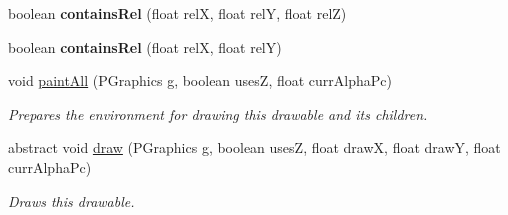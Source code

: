 \begin{DoxyCompactItemize}
\item 
\hypertarget{classhype_1_1core_1_1drawable_1_1_h_drawable_a8ae24b40927238f1be71ad4ff3120874}{boolean {\bfseries contains\-Rel} (float rel\-X, float rel\-Y, float rel\-Z)}\label{classhype_1_1core_1_1drawable_1_1_h_drawable_a8ae24b40927238f1be71ad4ff3120874}

\item 
\hypertarget{classhype_1_1core_1_1drawable_1_1_h_drawable_acd096b75e5eb22539a74db0528bf14a7}{boolean {\bfseries contains\-Rel} (float rel\-X, float rel\-Y)}\label{classhype_1_1core_1_1drawable_1_1_h_drawable_acd096b75e5eb22539a74db0528bf14a7}

\item 
void \hyperlink{classhype_1_1core_1_1drawable_1_1_h_drawable_a700c4d4a347c13048ccfb92ea4f6f50b}{paint\-All} (P\-Graphics g, boolean uses\-Z, float curr\-Alpha\-Pc)
\begin{DoxyCompactList}\small\item\em Prepares the environment for drawing this drawable and its children. \end{DoxyCompactList}\item 
abstract void \hyperlink{classhype_1_1core_1_1drawable_1_1_h_drawable_ae06fef8620c103f6656b9c57a1f0dacd}{draw} (P\-Graphics g, boolean uses\-Z, float draw\-X, float draw\-Y, float curr\-Alpha\-Pc)
\begin{DoxyCompactList}\small\item\em Draws this drawable. \end{DoxyCompactList}\end{DoxyCompactItemize}
